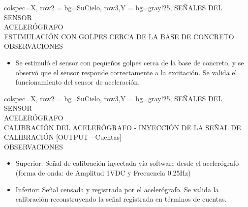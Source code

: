 % 
\newpage
\begin{tblr}{
        colspec={X},
        row{2} = {bg=SuCielo},
        row{3,Y} = {bg=gray!25},
    } %
    SEÑALES DEL SENSOR \\
    ACELERÓGRAFO \MakeUppercase{} \\
    ESTIMULACIÓN CON GOLPES CERCA DE LA BASE DE CONCRETO \\
    OBSERVACIONES \\
    \begin{itemize}
        \item Se estimuló el sensor con pequeños golpes cerca de la base de concreto, y se observó que el sensor responde correctamente a la excitación. Se valida el funcionamiento del sensor de aceleración.
    \end{itemize}
\end{tblr}
% 
\newpage
\begin{tblr}{
        colspec={X},
        row{2} = {bg=SuCielo},
        row{3,Y} = {bg=gray!25},
    } %
    SEÑALES DEL SENSOR \\
    ACELERÓGRAFO \MakeUppercase{} \\
    CALIBRACIÓN DEL ACELERÓGRAFO - INYECCIÓN DE LA SEÑAL DE CALIBRACIÓN [OUTPUT - Cuentas] \\
    OBSERVACIONES \\
    \begin{itemize}
        \item Superior: Señal de calibración inyectada vía software desde el acelerógrafo (forma de onda:  de Amplitud 1VDC y Frecuencia 0.25Hz)
        \item Inferior: Señal censada y registrada por el acelerógrafo. Se valida la calibración reconstruyendo la señal registrada en términos de cuentas.
    \end{itemize}
\end{tblr}
% 
\newpage
